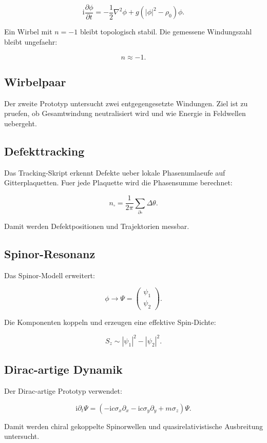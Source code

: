 \documentclass[11pt,a4paper]{article}
\newcommand{\ii}{\mathrm{i}}
\begin{document}
\[
\ii\frac{\partial\phi}{\partial t}
=
-\frac{1}{2}\nabla^2\phi
+
g(|\phi|^2-\rho_0)\phi.
\]

Ein Wirbel mit $n=-1$ bleibt topologisch stabil. Die gemessene Windungszahl bleibt ungefaehr:

\[
n\approx -1.
\]

\subsection{Wirbelpaar}

Der zweite Prototyp untersucht zwei entgegengesetzte Windungen. Ziel ist zu pruefen, ob Gesamtwindung neutralisiert
wird und wie Energie in Feldwellen uebergeht.

\subsection{Defekttracking}

Das Tracking-Skript erkennt Defekte ueber lokale Phasenumlaeufe auf Gitterplaquetten. Fuer jede Plaquette wird
die Phasensumme berechnet:

\[
n_{\square}
=
\frac{1}{2\pi}
\sum_{\partial\square}
\Delta\theta.
\]

Damit werden Defektpositionen und Trajektorien messbar.

\subsection{Spinor-Resonanz}

Das Spinor-Modell erweitert:

\[
\phi \rightarrow
\Psi=
\begin{pmatrix}
\psi_1\\
\psi_2
\end{pmatrix}.
\]

Die Komponenten koppeln und erzeugen eine effektive Spin-Dichte:

\[
S_z\sim |\psi_1|^2-|\psi_2|^2.
\]

\subsection{Dirac-artige Dynamik}

Der Dirac-artige Prototyp verwendet:

\[
\ii\partial_t\Psi
=
\left(
-\ii c\sigma_x\partial_x
-\ii c\sigma_y\partial_y
+
m\sigma_z
\right)\Psi.
\]

Damit werden chiral gekoppelte Spinorwellen und quasirelativistische Ausbreitung untersucht.
\end{document}
